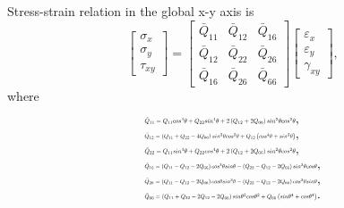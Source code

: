 Stress-strain relation in the global x-y axis is
\begin{equation}
	\label{equ:stress-strain}
	\left[\begin{array}{l}
			\sigma _{x} \\ 
			\sigma _{y} \\
			\tau_{xy}
			\end{array}
	\right]=
	\left[\begin{array}{lll}
			\bar{Q}_{11} & \bar{Q}_{12} & \bar{Q}_{16}\\ 
			\bar{Q}_{12} & \bar{Q}_{22} & \bar{Q}_{26} \\
			\bar{Q}_{16} & \bar{Q}_{26} &\bar{Q}_{66}
		\end{array}
	 \right]
	 \left[\begin{array}{l}
			 \varepsilon_{x} \\ 
	 		 \varepsilon_{y} \\ 
	 		 \gamma_{x y}
	 		\end{array}
	\right] \textstyle{,}
\end{equation}
where
\begin{equation}
	\begin{array}{l}
		\resizebox{.35\textwidth}{!}{$\bar{Q}_{11}=Q_{11} cos^{4}\theta+Q_{22} sin^{4}\theta+2\left(Q_{12}+2
		Q_{66}\right) sin^{2}\theta cos^{2}\theta$}\textstyle{,} \\
		\resizebox{.35\textwidth}{!}{$\bar{Q}_{12}=\left(Q_{11}+Q_{22}-4 Q_{66}\right) sin^{2}\theta
			cos^{2}\theta+Q_{12}\left(cos^{4}\theta+sin^{2}\theta \right)$} \textstyle{,}\\
		\resizebox{.35\textwidth}{!}{$\bar{Q}_{22}=Q_{11} sin^{4}\theta+Q_{22} cos^{4}\theta+2\left(Q_{12}+2
				Q_{66}\right) sin^{2}\theta cos^{2}\theta$}\textstyle{,} \\
		\resizebox{.40\textwidth}{!}{$\bar{Q}_{16}=\left(Q_{11}-Q_{12}-2
			Q_{66}\right) cos^{3}\theta
			sin\theta-\left(Q_{22}-Q_{12}-2Q_{66}\right) sin^{3}\theta cos\theta$} \textstyle{,}\\ 
		\resizebox{.40\textwidth}{!}{$\bar{Q}_{26}=\left(Q_{11}-Q_{12}-2
			Q_{66}\right) cos\theta sin^{3}\theta-\left(Q_{22}-Q_{12}-2
			Q_{66}\right)cos^{3}\theta sin\theta$} \textstyle{,}\\ 
		\resizebox{.40\textwidth}{!}	{$\bar{Q}_{66}=\left(Q_{11}+Q_{22}-2 Q_{12}-2 Q_{66}\right)
			sin\theta^{2}cos\theta^{2}+Q_{66}\left(sin\theta^{4}+cos\theta^{4}\right)$}\textstyle{.}\\
	\end{array}
\end{equation}

